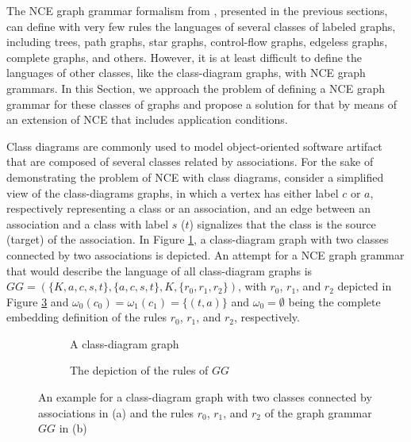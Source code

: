 
The NCE graph grammar formalism from \cite{janssens1982graph}, presented in the previous sections, can define with very few rules the languages of several classes of labeled graphs, including trees, path graphs, star graphs, control-flow graphs, edgeless graphs, complete graphs, and others. However, it is at least difficult to define the languages of other classes, like the class-diagram graphs, with NCE graph grammars. In this Section, we approach the problem of defining a NCE graph grammar for these classes of graphs and propose a solution for that by means of an extension of NCE that includes application conditions.

Class diagrams are commonly used to model object-oriented software artifact that are composed of several classes related by associations. For the sake of demonstrating the problem of NCE with class diagrams, consider a simplified view of the class-diagrams graphs, in which a vertex has either label $c$ or $a$, respectively representing a class or an association, and an edge between an association and a class with label $s$ ($t$) signalizes that the class is the source (target) of the association. In Figure \ref{fig:classdiagram-g}, a class-diagram graph with two classes connected by two associations is depicted. An attempt for a NCE graph grammar that would describe the language of all class-diagram graphs is $GG = (\{K,a,c,s,t\}, \{a,c,s,t\}, K, \{r_0, r_1, r_2\})$, with $r_0$, $r_1$, and $r_2$ depicted in Figure \ref{fig:classdiagram-gg} and $\omega_0(c_0) = \omega_1(c_1) = \{(t,a)\}$ and $\omega_0 = \emptyset$ being the complete embedding definition of the rules $r_0$, $r_1$, and $r_2$, respectively.

\begin{figure}[h]
	\begin{subfigure}[t]{0.5\textwidth}
		\centering
		
		\caption{A class-diagram graph}
		\label{fig:classdiagram-g}
	\end{subfigure}
	\begin{subfigure}[t]{0.49\textwidth}
		\centering
		
		\caption{The depiction of the rules of $GG$}
		\label{fig:classdiagram-gg}
	\end{subfigure}
	\caption{An example for a class-diagram graph with two classes connected by associations in (a) and the rules $r_0$, $r_1$, and $r_2$ of the graph grammar $GG$ in (b)}
\end{figure}


